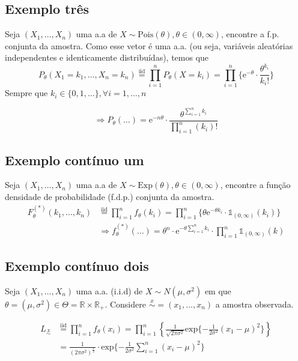 \documentclass[
  letterpaper,
  DIV=11,
  numbers=noendperiod]{scrreprt}
\begin{document}
\subsection{Exemplo três}\label{exemplo-truxeas}

Seja \((X_{1},\dots,X_{n})\) uma a.a de
\(X\sim\text{Pois}(\theta), \theta \in(0,\infty)\), encontre a f.p.
conjunta da amostra. Como esse vetor é uma a.a. (ou seja, variáveis
aleatórias independentes e identicamente distribuídas), temos que \[
P_\theta(X_1=k_{1},\dots,X_{n}=k_{n})\stackrel{\text{iid}}{=}\prod^{n}_{i=1}P_\theta(X=k_{i})=\prod^{n}_{i=1}\{\mathrm{e}
^{-\theta} \cdot \frac{\theta^{k_{i}}}{k_{i}!}\}
\] Sempre que \(k_{i}\in\{0,1,\dots \}, \forall i = 1,\dots,n\)

\[
\Rightarrow P_\theta(\dots)=\mathrm{e}^{-n \theta} \cdot \frac{\theta^{\sum\limits^{n}_{i=1}k_{i}}}{\prod^{n}_{i=1}
(k_{i})!}
\]

\subsection{Exemplo contínuo um}\label{exemplo-contuxednuo-um}

Seja \((X_{1},\dots,X_{n})\) uma a.a de
\(X\sim\text{Exp}(\theta), \theta \in(0,\infty)\), encontre a função
densidade de probabilidade (f.d.p.) conjunta da amostra. \[
\begin{aligned}
F_{\theta}^{(*)}(k_{1},\dots,k_{n})&\stackrel{\text{iid}}{=}\prod^{n}_{i=1}f_\theta(k_{i})=\prod^{n}_{i=1}
\{\theta \mathrm{e}^{-\theta k_{i}} \cdot \mathbb{1}_{(0,\infty )}(k_{i}) \}
\\&\Rightarrow f_\theta^{(*)}(\dots)=\theta^{n}
\cdot \mathrm{e}^{-\theta\sum\limits^{n}_{i=1}k_{i}} \cdot\prod^{n}_{i=1}\mathbb{1}_{(0,\infty)}(k)
\end{aligned}
\]

\subsection{Exemplo contínuo dois}\label{exemplo-contuxednuo-dois}

Seja \((X_{1},\dots,X_{n})\) uma a.a. (i.i.d) de
\(X\sim N(\mu,\sigma^{2})\) em que
\(\theta=(\mu, \sigma^{2}) \in \Theta=\mathbb{R}\times \mathbb{R}_{+}\).
Considere \(\stackrel{x}{\sim}=(x_{1},\dots,x_{n})\) a amostra
observada.

\[
\begin{aligned}
L_{\stackrel{X}{\sim}} &\stackrel{\text{iid}}{=} \prod^{n}_{i=1}f_\theta(x_{i})=
\prod^{n}_{i=1}\left\{\frac{1}{\sqrt{2 \pi \sigma^{2}}} \mathrm{exp}\{- \frac{1}{2\sigma^{2}}(x_{1}-\mu)^{2}\}\right\} \\
&= \frac{1}{(2 \pi \sigma^{2})^{\frac{x}{2}}}\cdot \mathrm{exp}\{- \frac{1}{2 \sigma^{2}} \sum\limits^{n}_{i=1}(x_{i}-\mu)^{2}  \}
\end{aligned}
\]
\end{document}
